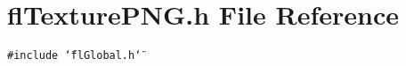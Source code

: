 \section{fl\-Texture\-PNG.h File Reference}
\label{flTexturePNG_8h}
{\tt \#include \char`\"{}fl\-Global.h\char`\"{}}\par
